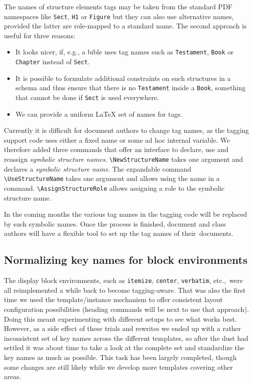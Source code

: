 \documentclass{ltnews}
\begin{document}
 The names of structure elements tags may be taken from the standard
 PDF namespaces like \verb|Sect|, \verb|H1| or \verb|Figure| but they
 can also use alternative names, provided the latter are role-mapped to
 a standard name. The second approach is useful for three reasons:
  \begin{itemize}
  \item It looks nicer, if, e.g., a bible uses tag names such as
    \texttt{Testament}, \texttt{Book} or \texttt{Chapter} instead of
    \texttt{Sect}.
  \item It is possible to formulate additional constraints on such
    structures in a schema and thus ensure that there is no
    \texttt{Testament} inside a \texttt{Book}, something that cannot
    be done if \texttt{Sect} is used everywhere.
  \item We can provide a uniform \LaTeX{} set of names for tags.
  \end{itemize}
  
  Currently it is difficult for document authors to change tag names,
  as the tagging support code uses either a fixed name or some ad hoc
  internal variable. We therefore added three commands that offer an
  interface to declare, use and reassign \emph{symbolic structure
  names}. \verb+\NewStructureName+ takes one argument and declares a
  \emph{symbolic structure name}. The expandable command
  \verb+\UseStructureName+ takes one argument and allows using the name
  in a  command. \verb+\AssignStructureRole+ allows
  assigning a role to the symbolic structure name.

  In the coming months the various tag names in the tagging code will
  be replaced by such symbolic names. Once the process is finished,
  document and class authors will have a flexible tool to set up the
  tag names of their~documents.


\subsection{Normalizing key names for block environments}

The display block environments, such as \texttt{itemize},
\texttt{center}, \texttt{verbatim}, etc.,\ were all reimplemented
a while back to become tagging-aware. That was also the first time we
used the template/instance mechanism to offer consistent layout
configuration possibilities (heading commands will be next to use that
approach). Doing this meant experimenting with different setups to see
what works best. However, as a side effect of these trials and
rewrites we ended up with a rather inconsistent set of key names
across the different templates, so after the dust had settled it was
about time to take a look at the complete set and standardize the key
names as much as possible.  This task has been largely
completed, though some changes are still likely while we
develop more templates covering other areas.
\end{document}
